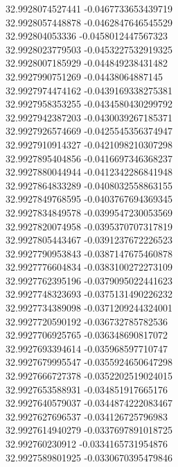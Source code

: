 {32.9928074527441	-0.0467733653439719\\
32.9928057448878	-0.0462847646545529\\
32.992804053336	-0.0458012447567323\\
32.9928023779503	-0.0453227532919325\\
32.9928007185929	-0.044849238431482\\
32.9927990751269	-0.04438064887145\\
32.9927974474162	-0.0439169338275381\\
32.9927958353255	-0.0434580430299792\\
32.9927942387203	-0.0430039267185371\\
32.9927926574669	-0.0425545356374947\\
32.9927910914327	-0.0421098210307298\\
32.9927895404856	-0.0416697346368237\\
32.9927880044944	-0.0412342286841948\\
32.9927864833289	-0.0408032558863155\\
32.9927849768595	-0.0403767694369345\\
32.9927834849578	-0.0399547230053569\\
32.9927820074958	-0.0395370707317819\\
32.9927805443467	-0.0391237672226523\\
32.9927790953843	-0.0387147675460878\\
32.9927776604834	-0.0383100272273109\\
32.9927762395196	-0.0379095022441623\\
32.9927748323693	-0.0375131490226232\\
32.9927734389098	-0.0371209244324001\\
32.9927720590192	-0.036732785782536\\
32.9927706925765	-0.036348690817072\\
32.9927693394614	-0.035968597710747\\
32.9927679995547	-0.0355924650647298\\
32.9927666727378	-0.0352202519024015\\
32.9927653588931	-0.034851917665176\\
32.9927640579037	-0.0344874222083467\\
32.9927627696537	-0.034126725796983\\
32.9927614940279	-0.0337697891018725\\
32.992760230912	-0.0334165731954876\\
32.9927589801925	-0.0330670395479846\\
}
